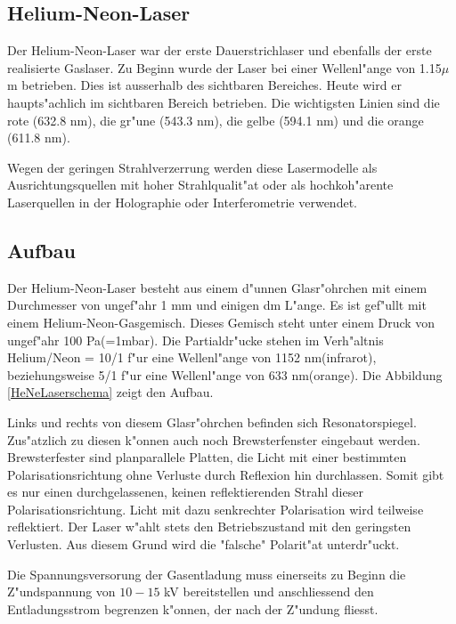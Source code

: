 \begin{refsection}


\section{Helium-Neon-Laser}
\label{He-Ne-Laser}

Der Helium-Neon-Laser war der erste Dauerstrichlaser und ebenfalls der erste 
realisierte Gaslaser. Zu Beginn wurde der Laser bei einer Wellenl"ange von 
1.15$\mu$m betrieben. Dies ist ausserhalb des sichtbaren Bereiches. Heute wird 
er haupts"achlich im sichtbaren Bereich betrieben. Die wichtigsten Linien sind 
die rote (632.8 nm), die gr"une (543.3 nm), die gelbe (594.1 nm) und die 
orange (611.8 nm).

Wegen der geringen Strahlverzerrung werden diese Lasermodelle als 
Ausrichtungsquellen mit hoher Strahlqualit"at oder als hochkoh"arente 
Laserquellen in der Holographie oder Interferometrie verwendet.

\subsection{Aufbau}
\label{He-Ne-Laser Aufbau}
Der Helium-Neon-Laser besteht aus einem d"unnen Glasr"ohrchen mit einem 
Durchmesser von ungef"ahr 1 mm und einigen dm L"ange. Es ist gef"ullt mit 
einem Helium-Neon-Gasgemisch. 
Dieses Gemisch steht unter einem Druck von ungef"ahr 100 Pa(=1mbar).
Die Partialdr"ucke stehen im Verh"altnis Helium/Neon = 10/1 f"ur eine 
Wellenl"ange von 1152 nm(infrarot),
beziehungsweise 5/1 f"ur eine Wellenl"ange von 633 nm(orange).
Die Abbildung \ref{HeNeLaserschema} zeigt den Aufbau.

Links und rechts von diesem Glasr"ohrchen befinden sich Resonatorspiegel.
Zus"atzlich zu diesen k"onnen auch noch Brewsterfenster eingebaut werden.
Brewsterfester sind planparallele Platten, die Licht mit einer bestimmten 
Polarisationsrichtung ohne Verluste durch Reflexion hin durchlassen. Somit 
gibt es nur einen durchgelassenen, keinen reflektierenden Strahl dieser 
Polarisationsrichtung. Licht mit dazu senkrechter Polarisation wird teilweise 
reflektiert.
Der Laser w"ahlt stets den Betriebszustand mit den geringsten Verlusten. Aus 
diesem Grund wird die "falsche" Polarit"at unterdr"uckt.

Die Spannungsversorung der Gasentladung muss einerseits zu Beginn die 
Z"undspannung von $10 - 15$ kV bereitstellen und anschliessend den 
Entladungsstrom begrenzen k"onnen, der nach der Z"undung fliesst.


\end{refsection}
